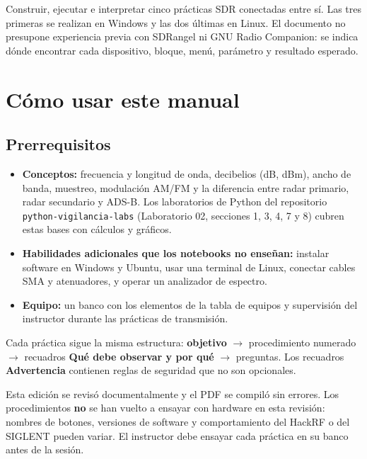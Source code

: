 \begin{objetivo}
Construir, ejecutar e interpretar cinco prácticas SDR conectadas entre sí. Las tres primeras se realizan en Windows y las dos últimas en Linux. El documento no presupone experiencia previa con SDRangel ni GNU Radio Companion: se indica dónde encontrar cada dispositivo, bloque, menú, parámetro y resultado esperado.
\end{objetivo}

\section{Cómo usar este manual}

\subsection{Prerrequisitos}

\begin{itemize}
    \item \textbf{Conceptos:} frecuencia y longitud de onda, decibelios (dB, dBm), ancho de banda, muestreo, modulación AM/FM y la diferencia entre radar primario, radar secundario y ADS-B. Los laboratorios de Python del repositorio \texttt{python-vigilancia-labs} (Laboratorio 02, secciones 1, 3, 4, 7 y 8) cubren estas bases con cálculos y gráficos.
    \item \textbf{Habilidades adicionales que los notebooks no enseñan:} instalar software en Windows y Ubuntu, usar una terminal de Linux, conectar cables SMA y atenuadores, y operar un analizador de espectro.
    \item \textbf{Equipo:} un banco con los elementos de la tabla de equipos y supervisión del instructor durante las prácticas de transmisión.
\end{itemize}

Cada práctica sigue la misma estructura: \textbf{objetivo} $\rightarrow$ procedimiento numerado $\rightarrow$ recuadros \textbf{Qué debe observar y por qué} $\rightarrow$ preguntas. Los recuadros \textbf{Advertencia} contienen reglas de seguridad que no son opcionales.

\begin{nota}
Esta edición se revisó documentalmente y el PDF se compiló sin errores. Los procedimientos \textbf{no} se han vuelto a ensayar con hardware en esta revisión: nombres de botones, versiones de software y comportamiento del HackRF o del SIGLENT pueden variar. El instructor debe ensayar cada práctica en su banco antes de la sesión.
\end{nota}

